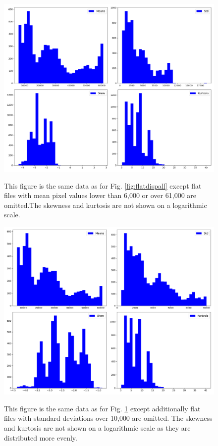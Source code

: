 \begin{figure}[!htbp]
\begin{center}
\includegraphics[scale=0.4]{images/flatdisplims.png}
\end{center}   
\caption{This figure is the same data as for Fig. \ref{fig:flatdispall} except
flat files with mean pixel values lower than 6,000 or over 61,000 are
omitted.The skewness and kurtosis are not shown on a logarithmic scale.}
\protect\label{fig:flatdisplims}
\end{figure}

\begin{figure}[!htbp]
\begin{center}
\includegraphics[scale=0.4]{images/flatdisplimssd10000.png}
\end{center}   
\caption{This figure is the same data as for Fig. \ref{fig:flatdisplims} except
additionally flat files with standard deviations over 10,000 are omitted.
The skewness and kurtosis are not shown on a logarithmic scale as they are
distributed more evenly.} \protect\label{fig:flatdisplimssd10000}
\end{figure}
\clearpage

